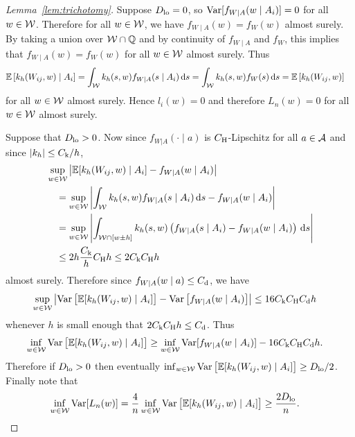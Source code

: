 \begin{proof}[Lemma~\ref{lem:trichotomy}]


  Suppose
  $D_{\textup{lo}} = 0$, so
  $\operatorname{Var}[f_{W \mid A}(w \mid A_i)] = 0$
  for all $w \in \mathcal{W}$.
  Therefore for all $w \in \mathcal{W}$,
  we have $f_{W \mid A}(w) = f_W(w)$ almost surely.
  By taking a union over $\mathcal{W} \cap \mathbb{Q}$
  and by continuity of $f_{W \mid A}$ and $f_W$,
  this implies that $f_{W \mid A}(w) = f_W(w)$
  for all $w \in \mathcal{W}$
  almost surely. Thus
  \begin{align*}
    \mathbb{E}\left[
      k_h(W_{i j},w) \mid A_i
    \right]
    &=
    \int_{\mathcal{W}}
    k_h(s,w)
    f_{W \mid A}(s \mid A_i)
    \,\mathrm{d}s
    =
    \int_{\mathcal{W}}
    k_h(s,w)
    f_W(s)
    \,\mathrm{d}s
    =
    \mathbb{E}\left[
      k_h(W_{i j},w)
    \right]
  \end{align*}
  for all $w \in \mathcal{W}$
  almost surely.
  Hence $l_i(w) = 0$
  and therefore $L_n(w) = 0$
  for all $w \in \mathcal{W}$ almost surely.


  Suppose that $D_{\textup{lo}} > 0$.
  Now since $f_{W|A}(\cdot \mid a)$ is $C_\mathrm{H}$-Lipschitz
  for all $a \in \mathcal{A}$
  and since $|k_h| \leq C_\mathrm{k}/h$,
  \begin{align*}
    &\sup_{w \in \mathcal{W}}
    \left|
    \mathbb{E}[k_h(W_{i j},w) \mid A_i]
    - f_{W \mid A}(w \mid A_i)
    \right| \\
    &\quad=
    \sup_{w \in \mathcal{W}}
    \left|
    \int_{\mathcal{W}}
    k_h(s,w)
    f_{W \mid A}(s \mid A_i)
    \,\mathrm{d}s
    - f_{W \mid A}(w \mid A_i)
    \right| \\
    &\quad=
    \sup_{w \in \mathcal{W}}
    \left|
    \int_{\mathcal{W} \cap [w \pm h]}
    k_h(s,w)
    \left(
      f_{W \mid A}(s \mid A_i)
      - f_{W \mid A}(w \mid A_i)
    \right)
    \,\mathrm{d}s
    \right| \\
    &\quad\leq
    2h
    \frac{C_\mathrm{k}}{h}
    C_\mathrm{H} h
    \leq
    2 C_\mathrm{k} C_\mathrm{H} h
  \end{align*}
  almost surely.
  Therefore since $f_{W \mid A}(w \mid a) \leq C_\mathrm{d}$,
  we have
  \begin{align*}
    \sup_{w \in \mathcal{W}}
    \left|
    \operatorname{Var}\big[
      \mathbb{E}[k_h(W_{i j},w) \mid A_i]
    \big]
    - \operatorname{Var}\left[
      f_{W \mid A}(w \mid A_i)
    \right]
    \right|
    &\leq
    16 C_\mathrm{k} C_\mathrm{H} C_\mathrm{d} h
  \end{align*}
  whenever $h$ is small enough that
  $2 C_\mathrm{k} C_\mathrm{H} h \leq C_\mathrm{d}$. Thus
  \begin{align*}
    \inf_{w \in \mathcal{W}} \operatorname{Var}\big[\mathbb{E}[k_h(W_{i j},w) \mid A_i]\big]
    &\geq
    \inf_{w \in \mathcal{W}}\operatorname{Var}[f_{W \mid A}(w \mid A_i)]
    - 16 C_\mathrm{k} C_\mathrm{H} C_\mathrm{d} h.
  \end{align*}
  Therefore if
  $D_{\textup{lo}} > 0$
  then eventually
  $\inf_{w \in \mathcal{W}} \operatorname{Var}\big[\mathbb{E}[k_h(W_{i j},w) \mid A_i]\big] \geq D_{\textup{lo}}/2$.
  Finally note that
  \begin{align*}
    \inf_{w \in \mathcal{W}}\operatorname{Var}[L_n(w)]
    &=
    \frac{4}{n}
    \inf_{w \in \mathcal{W}}
    \operatorname{Var}\big[\mathbb{E}[k_h(W_{i j},w) \mid A_i]\big]
    \geq
    \frac{2 D_{\textup{lo}}}{n}.
  \end{align*}


\end{proof}
